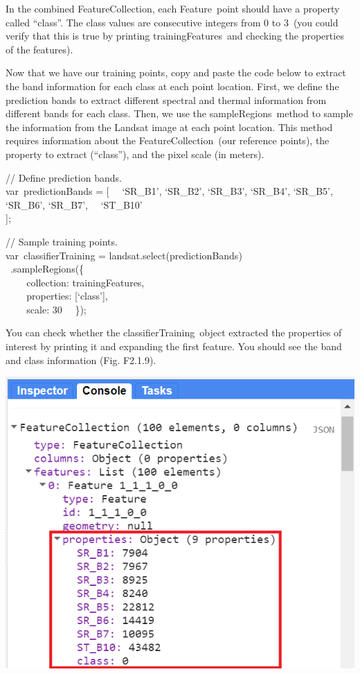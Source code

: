 \documentclass[
  letterpaper,
  DIV=11,
  numbers=noendperiod]{scrreprt}
\begin{document}
In the combined FeatureCollection, each Feature~point should have a
property called ``class''. The class values are consecutive integers
from 0 to 3~(you could verify that this is true by printing
trainingFeatures~and checking the properties of the features).

Now that we have our training points, copy and paste the code below to
extract the band information for each class at each point location.
First, we define the prediction bands to extract different spectral and
thermal information from different bands for each class. Then, we use
the sampleRegions~method to sample the information from the Landsat
image at each point location. This method requires information about the
FeatureCollection~(our reference points), the property to extract
(``class''), and the pixel scale (in meters).

// Define prediction bands.\\
var~predictionBands = {[}~ ~`SR\_B1', `SR\_B2', `SR\_B3', `SR\_B4',
`SR\_B5', `SR\_B6', `SR\_B7',~ ~`ST\_B10'\\
{]};

// Sample training points.\\
var~classifierTraining = landsat.select(predictionBands)\\
\hspace*{0.333em} ~.sampleRegions(\{\\
\hspace*{0.333em} ~ ~ ~collection: trainingFeatures,\\
\hspace*{0.333em} ~ ~ ~properties: {[}`class'{]},\\
\hspace*{0.333em} ~ ~ ~scale: 30~ ~\});

You can check whether the classifierTraining~object extracted the
properties of interest by printing it and expanding the first feature.
You should see the band and class information (Fig. F2.1.9).

\includegraphics{./F2/image20.png}
\end{document}
